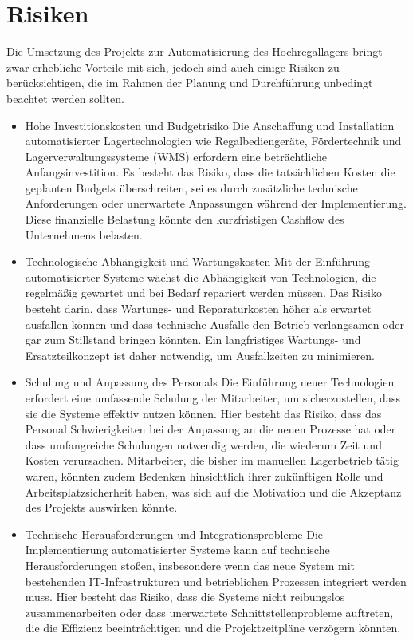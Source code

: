 \chapter{Risiken}


Die Umsetzung des Projekts zur Automatisierung des Hochregallagers bringt zwar erhebliche Vorteile mit sich, jedoch sind auch einige Risiken zu berücksichtigen, die im Rahmen der Planung und Durchführung unbedingt beachtet werden sollten.

\begin{itemize}
	\item Hohe Investitionskosten und Budgetrisiko
	Die Anschaffung und Installation automatisierter Lagertechnologien wie Regalbediengeräte, Fördertechnik und Lagerverwaltungssysteme (WMS) erfordern eine beträchtliche Anfangsinvestition. Es besteht das Risiko, dass die tatsächlichen Kosten die geplanten Budgets überschreiten, sei es durch zusätzliche technische Anforderungen oder unerwartete Anpassungen während der Implementierung. Diese finanzielle Belastung könnte den kurzfristigen Cashflow des Unternehmens belasten.
	\item Technologische Abhängigkeit und Wartungskosten
	Mit der Einführung automatisierter Systeme wächst die Abhängigkeit von Technologien, die regelmäßig gewartet und bei Bedarf repariert werden müssen. Das Risiko besteht darin, dass Wartungs- und Reparaturkosten höher als erwartet ausfallen können und dass technische Ausfälle den Betrieb verlangsamen oder gar zum Stillstand bringen könnten. Ein langfristiges Wartungs- und Ersatzteilkonzept ist daher notwendig, um Ausfallzeiten zu minimieren.
	\item Schulung und Anpassung des Personals
	 Die Einführung neuer Technologien erfordert eine umfassende Schulung der Mitarbeiter, um sicherzustellen, dass sie die Systeme effektiv nutzen können. Hier besteht das Risiko, dass das Personal Schwierigkeiten bei der Anpassung an die neuen Prozesse hat oder dass umfangreiche Schulungen notwendig werden, die wiederum Zeit und Kosten verursachen. Mitarbeiter, die bisher im manuellen Lagerbetrieb tätig waren, könnten zudem Bedenken hinsichtlich ihrer zukünftigen Rolle und Arbeitsplatzsicherheit haben, was sich auf die Motivation und die Akzeptanz des Projekts auswirken könnte.
	\item Technische Herausforderungen und Integrationsprobleme
	Die Implementierung automatisierter Systeme kann auf technische Herausforderungen stoßen, insbesondere wenn das neue System mit bestehenden IT-Infrastrukturen und betrieblichen Prozessen integriert werden muss. Hier besteht das Risiko, dass die Systeme nicht reibungslos zusammenarbeiten oder dass unerwartete Schnittstellenprobleme auftreten, die die Effizienz beeinträchtigen und die Projektzeitpläne verzögern könnten.

\end{itemize}
